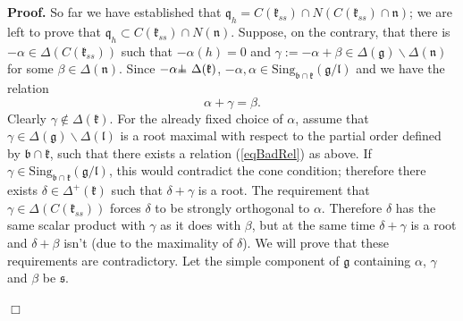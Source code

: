\documentclass[12pt]{report}
\newenvironment{proof}[1][]{ \textbf{Proof#1. }}{$\Box$\medskip}
\newcommand{\sS}{\mathfrak{s}}
\newcommand{\kk}{\mathfrak{k}}
\newcommand{\nn}{\mathfrak{n}}
\newcommand{\qq}{\mathfrak{q}}
\newcommand{\gG}{\mathfrak{g}}
\newcommand{\bb}{\mathfrak{b}}
\newcommand{\lL}{\mathfrak{l}}
\newcommand{\refeq}[1]{(\ref{#1})}
\newcommand{\hw}{\mathrm{Sing}}
\def\sperp{{\hbox{$\perp${\hbox{\kern -.77em $-$}\raise-1pt\hbox{\kern -.77em $-$}}\ }}}
\begin{document}
\begin{proof}
So far we have established that $\mathfrak{q}_h= C(\kk_{ss})\cap N(C(\kk_{ss})\cap\nn)$; we are left to prove that $\qq_h \subset C(\kk_{ss}) \cap N(\nn)$. Suppose, on the contrary, that there is $-\alpha\in\Delta(C(\kk_{ss}))$ such that  $-\alpha(h)= 0$ and $\gamma:=-\alpha+\beta\in\Delta(\gG)\backslash\Delta(\nn)$ for some $\beta\in\Delta(\nn)$. Since $-\alpha\sperp\Delta(\kk)$, $-\alpha,\alpha\in\hw_{\bb\cap\kk}(\gG/\lL)$ and we have the relation 
\begin{equation}\label{eqBadRel}
\alpha+\gamma=\beta.
\end{equation}
Clearly $\gamma\notin\Delta(\kk)$. For the already fixed choice of $\alpha$, assume that $\gamma\in\Delta(\gG) \backslash \Delta(\lL)$ is a root maximal with respect to the partial order defined by $\bb\cap \kk$, such that there exists a relation \refeq{eqBadRel} as above. If $\gamma\in \hw_{\bb\cap\kk}(\gG/\lL)$, this would contradict the cone condition; therefore there exists $\delta\in\Delta^+(\kk)$ such that $\delta+\gamma$ is a root. The requirement that $\gamma\in\Delta( C(\kk_{ss}))$ forces $\delta$ to be strongly orthogonal to $\alpha$. Therefore $\delta$ has the same scalar product with $\gamma$ as it does with $\beta$, but at the same time $\delta+\gamma$ is a root and $\delta+\beta$ isn't (due to the maximality of $\delta$). We will prove that these requirements are contradictory. Let the simple component of $\gG$ containing $\alpha$, $\gamma$ and $\beta$ be $\sS$.


\end{proof}
\end{document}
